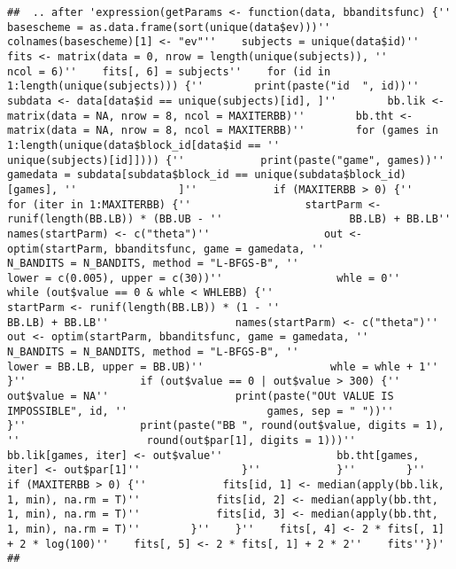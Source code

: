 \documentclass[11pt,,]{article}
\begin{document}
\begin{verbatim}
##  .. after 'expression(getParams <- function(data, bbanditsfunc) {''    basescheme = as.data.frame(sort(unique(data$ev)))''    colnames(basescheme)[1] <- "ev"''    subjects = unique(data$id)''    fits <- matrix(data = 0, nrow = length(unique(subjects)), ''        ncol = 6)''    fits[, 6] = subjects''    for (id in 1:length(unique(subjects))) {''        print(paste("id  ", id))''        subdata <- data[data$id == unique(subjects)[id], ]''        bb.lik <- matrix(data = NA, nrow = 8, ncol = MAXITERBB)''        bb.tht <- matrix(data = NA, nrow = 8, ncol = MAXITERBB)''        for (games in 1:length(unique(data$block_id[data$id == ''            unique(subjects)[id]]))) {''            print(paste("game", games))''            gamedata = subdata[subdata$block_id == unique(subdata$block_id)[games], ''                ]''            if (MAXITERBB > 0) {''                for (iter in 1:MAXITERBB) {''                  startParm <- runif(length(BB.LB)) * (BB.UB - ''                    BB.LB) + BB.LB''                  names(startParm) <- c("theta")''                  out <- optim(startParm, bbanditsfunc, game = gamedata, ''                    N_BANDITS = N_BANDITS, method = "L-BFGS-B", ''                    lower = c(0.005), upper = c(30))''                  whle = 0''                  while (out$value == 0 & whle < WHLEBB) {''                    startParm <- runif(length(BB.LB)) * (1 - ''                      BB.LB) + BB.LB''                    names(startParm) <- c("theta")''                    out <- optim(startParm, bbanditsfunc, game = gamedata, ''                      N_BANDITS = N_BANDITS, method = "L-BFGS-B", ''                      lower = BB.LB, upper = BB.UB)''                    whle = whle + 1''                  }''                  if (out$value == 0 | out$value > 300) {''                    out$value = NA''                    print(paste("OUt VALUE IS IMPOSSIBLE", id, ''                      games, sep = " "))''                  }''                  print(paste("BB ", round(out$value, digits = 1), ''                    round(out$par[1], digits = 1)))''                  bb.lik[games, iter] <- out$value''                  bb.tht[games, iter] <- out$par[1]''                }''            }''        }''        if (MAXITERBB > 0) {''            fits[id, 1] <- median(apply(bb.lik, 1, min), na.rm = T)''            fits[id, 2] <- median(apply(bb.tht, 1, min), na.rm = T)''            fits[id, 3] <- median(apply(bb.tht, 1, min), na.rm = T)''        }''    }''    fits[, 4] <- 2 * fits[, 1] + 2 * log(100)''    fits[, 5] <- 2 * fits[, 1] + 2 * 2''    fits''})'
## 

\end{verbatim}
\end{document}
